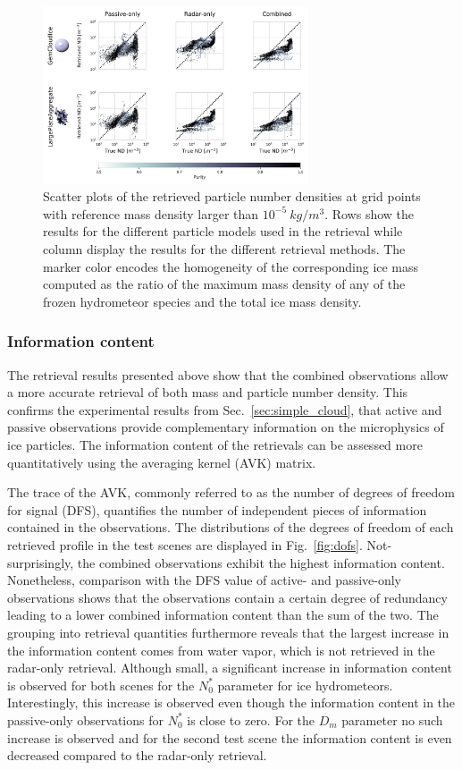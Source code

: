 \documentclass[journal abbreviation, manuscript]{copernicus}
\begin{document}
\begin{figure}
\centering
\includegraphics[width = 0.7\textwidth]{../plots/results_nd_scatter_a}
\caption{Scatter plots of the retrieved particle number densities at grid points
  with reference mass density larger than $10^{-5}\ \unit{kg/m^3}$. Rows show
  the results for the different particle models used in the retrieval while
  column display the results for the different retrieval methods. The marker
  color encodes the homogeneity of the corresponding ice mass computed as the
  ratio of the maximum mass density of any of the frozen hydrometeor species and
  the total ice mass density.}
\label{fig:results_nd_scatter_a}
\end{figure}

\subsubsection{Information content}

The retrieval results presented above show that the combined observations allow a more
accurate retrieval of both mass and particle number density. This confirms the
experimental results from Sec.~\ref{sec:simple_cloud}, that active and passive
observations provide complementary information on the microphysics of ice
particles. The information content of the retrievals can be assessed more
quantitatively using the averaging kernel (AVK) matrix.

The trace of the AVK, commonly referred to as the number of degrees of freedom
for signal (DFS), quantifies the number of independent pieces of information
contained in the observations. The distributions of the degrees of freedom of
each retrieved profile in the test scenes are displayed in Fig.~\ref{fig:dofs}.
Not-surprisingly, the combined observations exhibit the highest information
content. Nonetheless, comparison with the DFS value of active- and passive-only
observations shows that the observations contain a certain degree of redundancy
leading to a lower combined information content than the sum of the two. The
grouping into retrieval quantities furthermore reveals that the largest increase
in the information content comes from water vapor, which is not retrieved in the
radar-only retrieval. Although small, a significant increase in information
content is observed for both scenes for the $N_0^*$ parameter for ice
hydrometeors. Interestingly, this increase is observed even though the
information content in the passive-only observations for $N_0^*$ is close to
zero. For the $D_m$ parameter no such increase is observed and for the second
test scene the information content is even decreased compared to the radar-only
retrieval.
\end{document}
